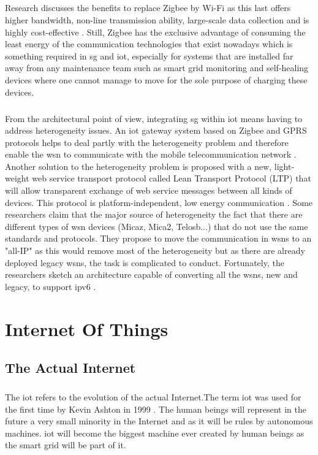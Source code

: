 \documentclass[oneside,12pt,a4paper,final]{book}
\begin{document}
\paragraph{}
Research discusses the benefits to replace Zigbee by Wi-Fi as this last offers higher bandwidth, non-line transmission ability, large-scale data collection and is highly cost-effective \cite{ref10}. Still, Zigbee has the exclusive advantage of consuming the least energy of the communication technologies that exist nowadays which is something required in \gls{sg} and \gls{iot}, especially for systems that are installed far away from any maintenance team such as smart grid monitoring and self-healing devices where one cannot manage to move for the sole purpose of charging these devices. 
\paragraph{}
From the architectural point of view, integrating \gls{sg} within \gls{iot} means having to address heterogeneity issues. An \gls{iot} gateway system based on Zigbee and GPRS protocols helps to deal partly with the heterogeneity problem and therefore enable the \gls{wsn} to communicate with the mobile telecommunication network \cite{ref11}. Another solution to the heterogeneity problem is proposed with a new, light-weight web service transport protocol called Lean Transport Protocol (LTP) that will allow transparent exchange of web service messages between all kinds of devices. This protocol is platform-independent, low energy communication \cite{ref12}. Some researchers claim that the major source of heterogeneity the fact that there are different types of \gls{wsn} devices (Micaz, Mica2, Telosb...) that do not use the same standards and protocols. They propose to move the communication in \glspl{wsn} to an "all-IP" as this would remove most of the heterogeneity but as there are already deployed legacy \glspl{wsn}, the task is complicated to conduct. Fortunately, the researchers sketch an architecture capable of converting all the \glspl{wsn}, new and legacy, to support \gls{ipv6} \cite{ref13}.


\chapter{Internet Of Things}
\section{The Actual Internet}
\paragraph{}
The \gls{iot} refers to the evolution of the actual Internet.The term \gls{iot} was used for the first time by Kevin Ashton in 1999 \cite{ref17}. The human beings will represent in the future a very small minority in the Internet and as it will be rules by autonomous machines. \gls{iot} will become the biggest machine ever created by human beings as the smart grid will be part of it.
\end{document}
